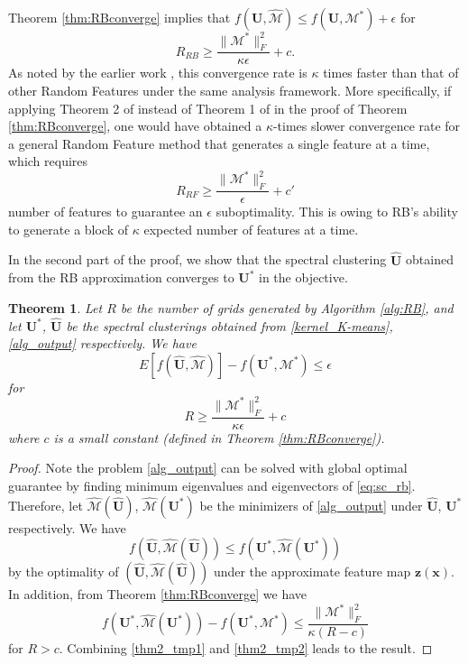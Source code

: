 \documentclass[sigconf]{acmart}
\newtheorem{theorem}{Theorem}
\newcommand{\1}{\boldsymbol{1}}
\newcommand{\bx}{\boldsymbol{x}}
\newcommand{\bz}{\boldsymbol{z}}
\newcommand{\bU}{\mathbf{U}}
\newcommand{\cM}{\mathcal{M}}
\newcommand{\bUh}{\widehat{\bU}}
\newcommand{\cMh}{\widehat{\cM}}
\newcommand{\0}{\boldsymbol{0}}
\begin{document}
Theorem \ref{thm:RBconverge} implies that $f(\bU,\cMh)\leq f(\bU,\cM^*)+\epsilon$ for
\begin{equation}\label{tmp3}
R_{RB}\geq \frac{\|\cM^*\|_F^2}{\kappa\epsilon}+c.
\end{equation}
As noted by the earlier work \cite{wu2016revisiting}, this convergence rate is $\kappa$ times faster than that of other Random Features under the same analysis framework. More specifically, if applying Theorem 2 of \cite{yen2014sparse} instead of Theorem 1 of \cite{wu2016revisiting} in the proof of Theorem \ref{thm:RBconverge}, one would have obtained a $\kappa$-times slower convergence rate for a general Random Feature method that generates a single feature at a time, which requires
$$
R_{RF}\geq \frac{\|\cM^*\|_F^2}{\epsilon}+c'
$$
number of features to guarantee an $\epsilon$ suboptimality. This is owing to RB's ability to generate a block of $\kappa$ expected number of features at a time. 

In the second part of the proof, we show that the spectral clustering $\bUh$ obtained from the RB approximation converges to $\bU^*$ in the objective.

\begin{theorem}\label{thm:SCconverge}
Let $R$ be the number of grids generated by Algorithm \ref{alg:RB}, and let $\bU^*$, $\bUh$ be the spectral clusterings obtained from \eqref{kernel_K-means}, \eqref{alg_output} respectively. We have
\begin{equation}\label{eq:RBconverge}
E[f(\bUh,\cMh)] - f(\bU^*,\cM^*) \leq \epsilon
\end{equation}
for
$$
R\geq \frac{\|\cM^*\|_F^2}{\kappa\epsilon}+c
$$
where $c$ is a small constant (defined in Theorem \ref{thm:RBconverge}).
\end{theorem}
\begin{proof}
Note the problem \eqref{alg_output} can be solved with global optimal guarantee by finding minimum eigenvalues and eigenvectors of \eqref{eq:sc_rb}. Therefore, let $\cMh(\bUh)$, $\cMh(\bU^*)$ be the minimizers of \eqref{alg_output} under $\bUh$, $\bU^*$ respectively. We have
\begin{equation}\label{thm2_tmp1}
f(\bUh,\cMh(\bUh)) \leq f(\bU^*,\cMh(\bU^*))
\end{equation}
by the optimality of $(\bUh,\cMh(\bUh))$ under the approximate feature map $\bz(\bx)$. In addition, from Theorem \ref{thm:RBconverge} we have
\begin{equation}\label{thm2_tmp2}
f(\bU^*,\cMh(\bU^*))-f(\bU^*,\cM^*)\leq \frac{\|\cM^*\|_F^2}{\kappa (R-c)}
\end{equation}
for $R>c$. Combining \eqref{thm2_tmp1} and \eqref{thm2_tmp2} leads to the result.
\end{proof}
\end{document}
